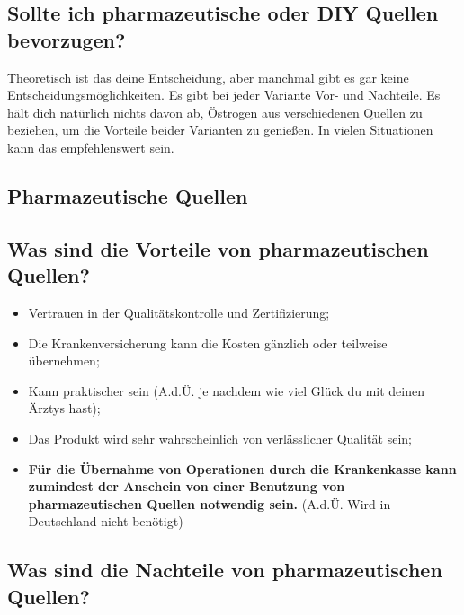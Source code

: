 \documentclass{article}
\begin{document}
\subsection{Sollte ich pharmazeutische oder DIY Quellen bevorzugen?}

Theoretisch ist das deine Entscheidung, aber manchmal gibt es gar keine Entscheidungsmöglichkeiten. Es gibt bei jeder Variante Vor- und Nachteile. Es hält dich natürlich nichts davon ab, Östrogen aus verschiedenen Quellen zu beziehen, um die Vorteile beider Varianten zu genießen. In vielen Situationen kann das empfehlenswert sein.

\subsection*{Pharmazeutische Quellen}

\subsection{Was sind die Vorteile von pharmazeutischen Quellen?}

\begin{itemize}
  \item Vertrauen in der Qualitätskontrolle und Zertifizierung;
  \item Die Krankenversicherung kann die Kosten gänzlich oder teilweise übernehmen;
  \item Kann praktischer sein (A.d.Ü. je nachdem wie viel Glück du mit deinen Ärztys hast);
  \item Das Produkt wird sehr wahrscheinlich von verlässlicher Qualität sein;
  \item \textbf{Für die Übernahme von Operationen durch die Krankenkasse kann zumindest der Anschein von einer Benutzung von pharmazeutischen Quellen notwendig sein.} (A.d.Ü. Wird in Deutschland nicht benötigt)
\end{itemize}

\subsection{Was sind die Nachteile von pharmazeutischen Quellen?}
\end{document}
